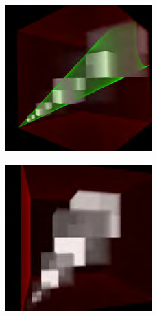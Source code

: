 \begin{figure}
	\begin{subfigure}[b]{0.243\textwidth}
		\includegraphics[width=\textwidth]{figures/vct/vct-8-1}
		\caption{}
	\end{subfigure}
	\begin{subfigure}[b]{0.243\textwidth}
		\includegraphics[width=\textwidth]{figures/vct/vct-8-2}

\end{subfigure}
\end{figure}
